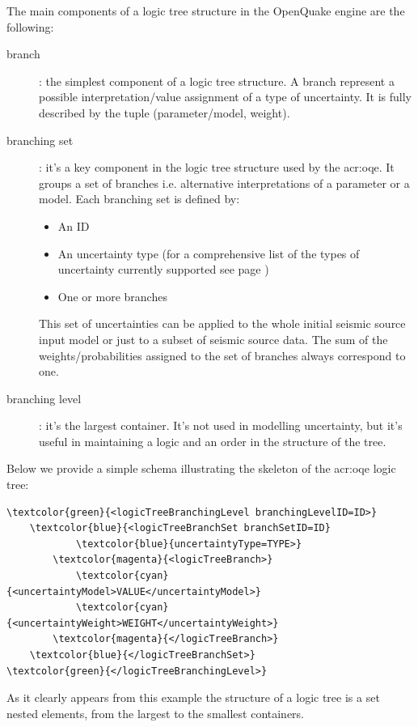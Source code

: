 The main components of a logic tree structure in the OpenQuake engine are 
the following:
\begin{description}
    \item[branch]: the simplest component of a logic tree structure. 
    A branch represent a possible interpretation/value assignment of 
    a type of uncertainty. It is fully described by the tuple 
    (parameter/model, weight).
    
    \item[branching set]: it's a key component in the logic tree structure 
    used by the \gls{acr:oqe}. It groups a set of branches i.e. 
    alternative interpretations of a parameter or a model. Each branching
    set is defined by:
    \begin{itemize}
        \item An ID 
        \item An uncertainty type (for a comprehensive list of the types of 
        uncertainty currently supported see page \pageref{list_epistemic_unc})
        \item One or more branches
    \end{itemize}
    
    This set of uncertainties can be applied to the whole initial 
    seismic source input model or just to a subset of seismic source
    data. The sum of the weights/probabilities assigned to the set 
    of branches always correspond to one.

    \item[branching level]: it's the largest container. It's not used in 
    modelling uncertainty, but it's useful in maintaining a logic and an 
    order in the structure of the tree.
\end{description}

Below we provide a simple schema illustrating the skeleton of the 
\gls{acr:oqe} logic tree:
\begin{Verbatim}[frame=single, commandchars=\\\{\}, fontsize=\small]
\textcolor{green}{<logicTreeBranchingLevel branchingLevelID=ID>}
    \textcolor{blue}{<logicTreeBranchSet branchSetID=ID}
            \textcolor{blue}{uncertaintyType=TYPE>}
        \textcolor{magenta}{<logicTreeBranch>}
            \textcolor{cyan}{<uncertaintyModel>VALUE</uncertaintyModel>}
            \textcolor{cyan}{<uncertaintyWeight>WEIGHT</uncertaintyWeight>}
        \textcolor{magenta}{</logicTreeBranch>}
    \textcolor{blue}{</logicTreeBranchSet>}
\textcolor{green}{</logicTreeBranchingLevel>}
\end{Verbatim}
As it clearly appears from this example the structure of a logic 
tree is a set nested elements, from the largest to the smallest 
containers.

